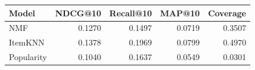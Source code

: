 \begin{tabular}{lrrrr}
\toprule
Model & NDCG@10 & Recall@10 & MAP@10 & Coverage \\
\midrule
NMF & 0.1270 & 0.1497 & 0.0719 & 0.3507 \\
ItemKNN & 0.1378 & 0.1969 & 0.0799 & 0.4970 \\
Popularity & 0.1040 & 0.1637 & 0.0549 & 0.0301 \\
\bottomrule
\end{tabular}
